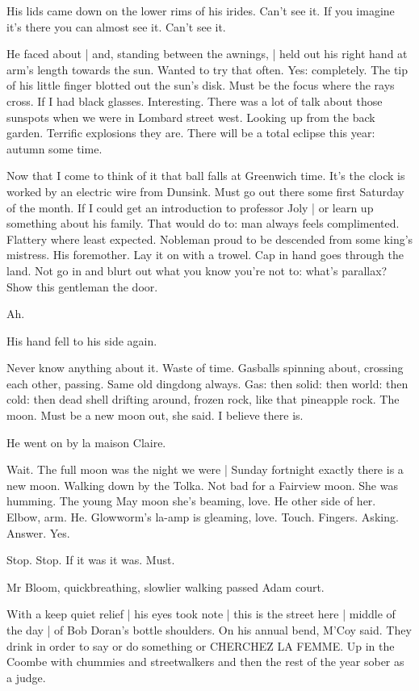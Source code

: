 His lids came down on the lower rims of his irides.
Can't see it.
If you imagine it's there you can almost see it.
Can't see it.

He faced about |
and, standing between the awnings, |
held out his right hand at arm's length towards the sun.
Wanted to try that often.
Yes:
completely.
The tip of his little finger blotted out the sun's disk.
Must be the focus where the rays cross.
If I had black glasses.
Interesting.
There was a lot of talk about those sunspots when we were in Lombard street west.
Looking up from the back garden.
Terrific explosions they are.
There will be a total eclipse this year:
autumn some time.

Now that I come to think of it 
that ball falls at Greenwich time.
It's the clock is worked by an electric wire from Dunsink.
Must go out there
some first Saturday of the month.
If I could get an introduction to professor Joly |
or learn up something about his family.
That would do to:
man always feels complimented.
Flattery where least expected.
Nobleman proud to be descended from some king's mistress.
His foremother.
Lay it on with a trowel.
Cap in hand goes through the land.
Not go in and blurt out what you know you're not to:
what's parallax?
Show this gentleman the door.

Ah.

His hand fell to his side again.

Never know anything about it.
Waste of time.
Gasballs spinning about,
crossing each other,
passing.
Same old dingdong always.
Gas:
then solid:
then world:
then cold:
then dead shell drifting around,
frozen rock,
like that pineapple rock.
The moon.
Must be a new moon out,
she said.
I believe there is.

He went on by la maison Claire.

Wait.
The full moon was the night we were |
Sunday fortnight exactly there is a new moon.
Walking down by the Tolka.
Not bad for a Fairview moon.
She was humming.
The young May moon she's beaming,
love.
He other side of her.
Elbow, arm.
He.
Glowworm's la-amp is gleaming, love.
Touch.
Fingers.
Asking.
Answer.
Yes.

Stop.
Stop.
If it was it was.
Must.

Mr Bloom, quickbreathing,
slowlier walking passed Adam court.

With a keep quiet relief |
his eyes took note |
this is the street here |
middle of the day |
of Bob Doran's bottle shoulders.
On his annual bend,
M'Coy said.
They drink in order to say or do something or
CHERCHEZ LA FEMME.
Up in the Coombe with chummies and streetwalkers
and then the rest of the year sober as a judge.

